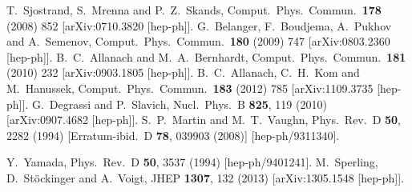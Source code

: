 \documentclass[final,3p,times]{elsarticle}
\begin{document}
\begin{thebibliography}{10}
  T.~Sjostrand, S.~Mrenna and P.~Z.~Skands,
  Comput.\ Phys.\ Commun.\  {\bf 178} (2008) 852
  [arXiv:0710.3820 [hep-ph]].
  G.~Belanger, F.~Boudjema, A.~Pukhov and A.~Semenov,
  Comput.\ Phys.\ Commun.\  {\bf 180} (2009) 747
  [arXiv:0803.2360 [hep-ph]].
  B.~C.~Allanach and M.~A.~Bernhardt,
  Comput.\ Phys.\ Commun.\  {\bf 181} (2010) 232
  [arXiv:0903.1805 [hep-ph]].
  B.~C.~Allanach, C.~H.~Kom and M.~Hanussek,
  Comput.\ Phys.\ Commun.\  {\bf 183} (2012) 785
  [arXiv:1109.3735 [hep-ph]].
  G.~Degrassi and P.~Slavich,
  Nucl.\ Phys.\ B {\bf 825}, 119 (2010)
  [arXiv:0907.4682 [hep-ph]].
  S.~P.~Martin and M.~T.~Vaughn,
  Phys.\ Rev.\ D {\bf 50}, 2282 (1994)
  [Erratum-ibid.\ D {\bf 78}, 039903 (2008)]
  [hep-ph/9311340].

  Y.~Yamada,
  Phys.\ Rev.\ D {\bf 50}, 3537 (1994)
  [hep-ph/9401241].
  M.~Sperling, D.~St\"ockinger and A.~Voigt,
  JHEP {\bf 1307}, 132 (2013)
  [arXiv:1305.1548 [hep-ph]].


\end{thebibliography}
\end{document}
